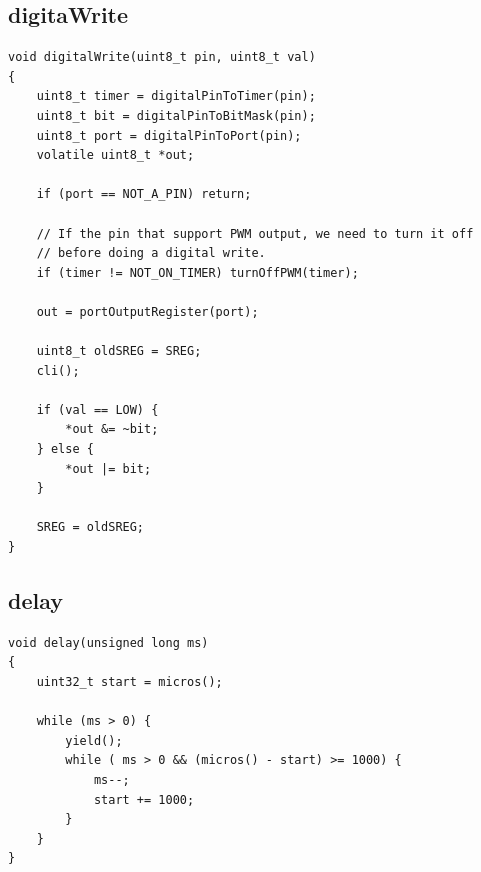 \subsection{digitaWrite}

\begin{lstlisting}
void digitalWrite(uint8_t pin, uint8_t val)
{
	uint8_t timer = digitalPinToTimer(pin);
	uint8_t bit = digitalPinToBitMask(pin);
	uint8_t port = digitalPinToPort(pin);
	volatile uint8_t *out;

	if (port == NOT_A_PIN) return;

	// If the pin that support PWM output, we need to turn it off
	// before doing a digital write.
	if (timer != NOT_ON_TIMER) turnOffPWM(timer);

	out = portOutputRegister(port);

	uint8_t oldSREG = SREG;
	cli();

	if (val == LOW) {
		*out &= ~bit;
	} else {
		*out |= bit;
	}

	SREG = oldSREG;
}
\end{lstlisting}

\subsection{delay}

\begin{lstlisting}
void delay(unsigned long ms)
{
	uint32_t start = micros();

	while (ms > 0) {
		yield();
		while ( ms > 0 && (micros() - start) >= 1000) {
			ms--;
			start += 1000;
		}
	}
}
\end{lstlisting}